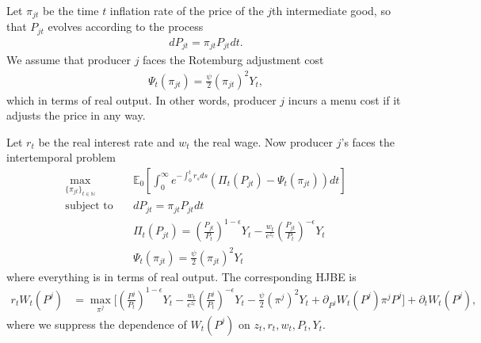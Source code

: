 \documentclass[notitlepage,a4paper,11pt]{report}
\numberwithin{section}{chapter}
\numberwithin{subsection}{section}
\newcommand{\expt}[2]{\mathbb{E}_{#1}\left[ #2 \right]}
\begin{document}
Let $\pi_{jt}$ be the time $t$ inflation rate of the price of the $j$th intermediate good, so that $P_{jt}$ evolves according to the process 
\begin{align*}
dP_{jt} = \pi_{jt} P_{jt} dt. 
\end{align*}
We assume that producer $j$ faces the Rotemburg adjustment cost
\begin{align*}
\Psi_t( \pi_{jt} ) = \frac{\psi}{2} (\pi_{jt})^2 Y_t, 
\end{align*}
which in terms of real output. In other words, producer $j$ incurs a menu cost if it adjusts the price in any way. 

Let $r_t$ be the real interest rate and $w_t$ the real wage. Now producer $j$'s faces the intertemporal problem 
\begin{align*}
\max_{ \{ \pi_{jt} \}_{t \in \mathbb{N}} } & \quad \expt{0}{ \int_0^{\infty} e^{ - \int_0^t r_s ds } \left( \Pi_t( P_{jt} ) - \Psi_t( \pi_{jt } ) \right) dt } \\[10pt]
\text{subject to} & \quad d P_{jt} = \pi_{jt} P_{jt} dt \\[10pt]
& \quad \Pi_t( P_{jt} ) =  \left( \frac{P_{jt}}{P_t} \right)^{1-\epsilon} Y_t   - \frac{w_t}{e^{z_t}} \left( \frac{P_{jt}}{P_t} \right)^{-\epsilon} Y_t   \\[10pt]
& \quad \Psi_t( \pi_{jt} ) = \frac{\psi}{2} (\pi_{jt})^2 Y_t
\end{align*}
where everything is in terms of real output. The corresponding HJBE is 
\begin{align*}
r_t W_t( P^j ) & = \max_{ \pi^j } \Bigg[  \left( \frac{P^j}{P_t} \right)^{1-\epsilon} Y_t   - \frac{w_t}{e^{z_t} } \left( \frac{P^j}{P_t} \right)^{-\epsilon} Y_t  - \frac{\psi}{2} (\pi^j)^2 Y_t + \partial_{P^j} W_t( P^j )  \pi^j P^j \Bigg]  + \partial_t W_t( P^j ), 
\end{align*}
where we suppress the dependence of $W_t( P^j)$ on $z_t, r_t, w_t ,P_t, Y_t$. 
\end{document}
